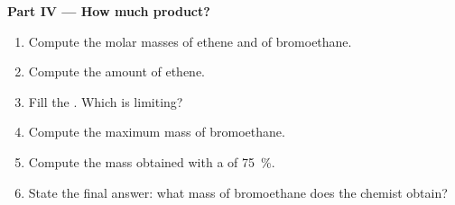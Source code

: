 \begin{problem}
\medskip
\noindent\textbf{Part IV --- How much product?}
\begin{enumerate}[resume]
  \item Compute the molar masses of ethene and of bromoethane.
  \item Compute the amount of ethene.
  \item Fill the . Which  is limiting?
  \item Compute the maximum mass of bromoethane.
  \item Compute the mass obtained with a  of \qty{75}{\percent}.
  \item State the final answer: what mass of bromoethane does the chemist
        obtain?
\end{enumerate}
\end{problem}
